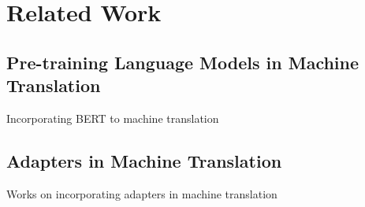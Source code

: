 \chapter{Related Work}

\section{Pre-training Language Models in Machine Translation}
Incorporating BERT to machine translation
\subsection{}
\subsection{}
\subsection{}

\section{Adapters in Machine Translation}
Works on incorporating adapters in machine translation
\subsection{}
\subsection{}
\subsection{}

